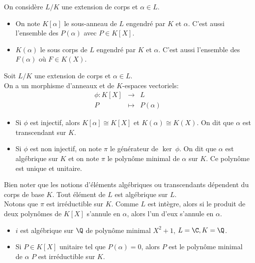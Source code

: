 \begin{definition}
	On considère $L/K$ une extension de corps et $\alpha \in L$. \\
	\begin{itemize}
		\item On note $K[\alpha]$ le sous-anneau de $L$ engendré par $K$ et $\alpha$. C'est aussi l'ensemble des $P(\alpha)$ avec $P \in K[X]$.
		\item $K(\alpha)$ le sous corps de $L$ engendré par $K$ et $\alpha$. C'est aussi l'ensemble des $F(\alpha)$ où $F \in K(X)$.
	\end{itemize}
\end{definition}


\begin{definition}
	Soit $L/K$ une extension de corps et $\alpha \in L$.\\
	On a un morphisme d'anneaux et de $K$-espaces vectoriels:
	\begin{eqnarray*}
		\phi: K[X] &\to& L \\
		P &\mapsto& P(\alpha)
	\end{eqnarray*}
	\begin{itemize}
		\item Si $\phi$ est injectif, alors $K[\alpha] \cong K[X]$ et $K(\alpha) \cong K(X)$. On dit que $\alpha$ est transcendant sur $K$.
		\item Si $\phi$ est non injectif, on note $\pi$ le générateur de $\ker\ \phi$. On dit que $\alpha$ est algébrique sur $K$ et on note $\pi$ le polynôme minimal de
		      $\alpha$ sur $K$. Ce polynôme est unique et unitaire.
	\end{itemize}
\end{definition}

\begin{remarque}
	Bien noter que les notions d'éléments algébriques ou transcendants dépendent du corps de base $K$. Tout élément de $L$ est algébrique sur $L$.\\
	Notons que $\pi$ est irréductible sur $K$. Comme $L$ est intègre, alors si le produit de deux polynômes de $K[X]$ s'annule en $\alpha$, alors l'un d'eux s'annule en $\alpha$.
\end{remarque}

\begin{example}
	\begin{itemize}
		\item $i$ est algébrique sur $\Q$ de polynôme minimal $X^2+1$, $L = \C, K = \Q$.
		\item Si $P \in K[X]$ unitaire tel que $P(\alpha) = 0$, alors $P$ est le polynôme minimal de $\alpha$ \ssi $P$ est irréductible sur $K$.
	\end{itemize}
\end{example}

